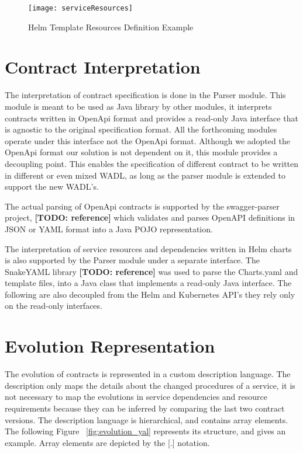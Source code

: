 \begin{figure}[htbp]
    \centering
    \texttt{[image: serviceResources]}
    \caption{Helm Template Resources Definition Example}
    \label{fig:serviceResources}
\end{figure}

\newpage

\section{Contract Interpretation} %
\label{sec:contract_interpretation}

The interpretation of contract specification is done in the Parser module.
This module is meant to be used as Java library by other modules,
it interprets contracts written in OpenApi format and provides a read-only Java interface
that is agnostic to the original specification format.
All the forthcoming modules operate under this interface not the OpenApi format.
Although we adopted the OpenApi format our solution is not dependent on it, this module provides a decoupling point.
This enables the specification of different contract to be written in different or even mixed WADL,
as long as the parser module is extended to support the new WADL's.

The actual parsing of OpenApi contracts is supported by the swagger-parser project, \textbf{[TODO: reference]}
which validates and parses OpenAPI definitions in JSON or YAML format into a Java POJO representation.

The interpretation of service resources and dependencies written in Helm charts is also supported by the Parser module under a separate interface.
The SnakeYAML library \textbf{[TODO: reference]} was used to parse the Charts.yaml and template files, into a Java class that implements a read-only Java interface.
The following are also decoupled from the Helm and Kubernetes API's they rely only on the read-only interfaces.

\newpage

\section{Evolution Representation} %
\label{sec:evolution_representation}

The evolution of contracts is represented in a custom description language.
The description only maps the details about the changed procedures of a service,
it is not necessary to map the evolutions in service dependencies and resource requirements because they can be inferred by comparing the last two contract versions.
The description language is hierarchical, and contains array elements.
The following Figure ~\ref{fig:evolution_yal} represents its structure, and gives an example.
Array elements are depicted by the [.] notation.

